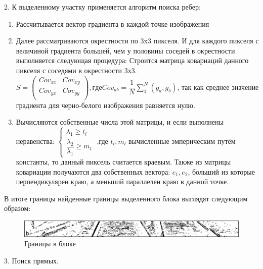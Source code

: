 2. К выделенному участку применяется алгоритм поиска ребер: 
\begin{enumerate}
	\item Рассчитывается вектор градиента в каждой точке изображения
	\item Далее рассматриваются окрестности по 3x3 пикселя. И для каждого пикселя с величиной градиента большей, чем у половины соседей в окрестности выполняется следующая
	процедура: 
	Строится матрица ковариаций данного пикселя с соседями в окрестности 3х3. 
	$
	S = \left(
	\begin{array}{cccc}
	Cov_{xx} & Cov_{xy}\\
	Cov_{yx} & Cov_{yy}\\
	\end{array}
	\right), где
	Cov_{ab} = \dfrac{1}{N} \sum_{1}^{N} (g_a, g_b)
	$, так как среднее значение градиента для черно-белого изображения равняется нулю. 
	\item Вычисляются собственные числа этой матрицы, и если выполнены неравенства:
	$
	\begin{cases}
	\lambda_1 \geq t_l\\
	\dfrac{\lambda_2}{\lambda_1} \geq m_l 
	\end{cases}
	$
	,где $t_l, m_l$ вычисленные эмперическим путём константы, то данный пиксель считается
	краевым.
	Также из матрицы ковариации получаются два собственных вектора:
	$e_1, e_2$, больший из которые перпендикулярен краю, а меньший параллелен краю в данной точке.
\end{enumerate}
В итоге границы найденные границы выделенного блока выглядят следующим образом:
\begin{figure}[!h]
	\centering
	\includegraphics[width=0.9\linewidth]{pictures/screenshot002}
	\caption{Границы в блоке}
	\label{fig:screenshot002}
\end{figure}

3. Поиск прямых.

